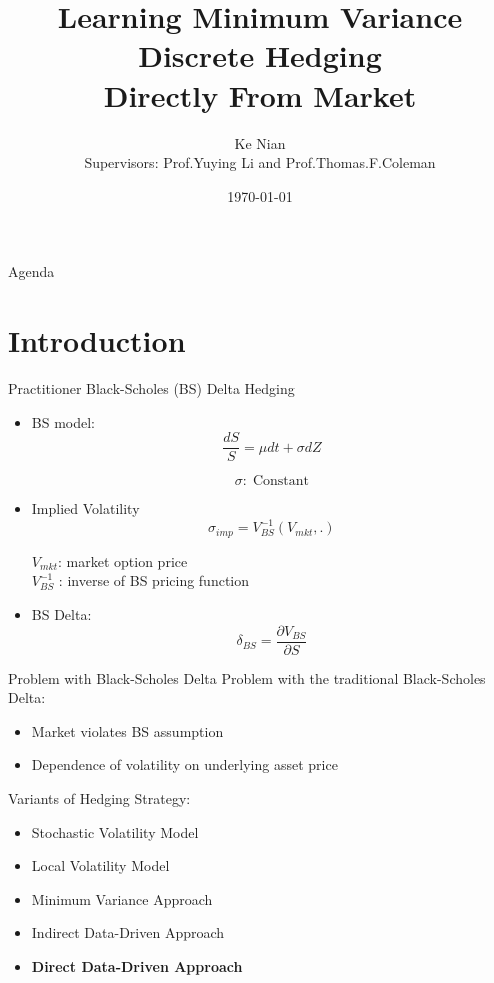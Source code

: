 \documentclass[10pt,table,mathserif]{beamer}
\title[Learning Minimum Variance Discrete Hedging Directly From Market]%
{Learning Minimum Variance Discrete Hedging \\Directly From Market}
\author[Ke Nian ] %
{ Ke Nian\\
 Supervisors: Prof.Yuying Li and Prof.Thomas.F.Coleman
}
\institute[
  David R. Cheriton School of Computer Science, University of Waterloo
] %
{%
  David R. Cheriton School of Computer Science,\\
  University of Waterloo,\\
  Waterloo, Canada
}
\date{\today}
\begin{document}
\begin{frame}[plain] %
  \titlepage
\end{frame}

\begin{frame}{Agenda}{}
\tableofcontents
\end{frame}

\section{Introduction}


\begin{frame}{Practitioner Black-Scholes (BS) Delta Hedging}

\begin{itemize}
  \item BS model:
\[
\frac{d S}{ S}= \mu dt +\sigma dZ
\]

\[
\sigma:\; \text{Constant}
\]
\item Implied Volatility
  \[
  \sigma_{imp}=V_{BS}^{-1}(V_{mkt},.)
  \]
  \begin{center}
  $V_{mkt}$: market option price \\ $V_{BS}^{-1}$ : inverse of BS pricing function
  \end{center}

\item BS Delta:
\[
\delta_{BS}=\frac{\partial V_{BS}}{ \partial S}
\]
\end{itemize}

\end{frame}






\begin{frame}{Problem with Black-Scholes Delta}
Problem with the traditional Black-Scholes Delta:
\begin{itemize}
  \item Market violates BS assumption
  \item Dependence of volatility on underlying asset price
\end{itemize}
Variants of Hedging Strategy:
\begin{itemize}
  \item Stochastic Volatility Model
  \item Local Volatility Model
  \item Minimum Variance Approach
  \item Indirect Data-Driven Approach
  \item \textbf{Direct Data-Driven Approach}
\end{itemize}
\end{frame}
\end{document}
